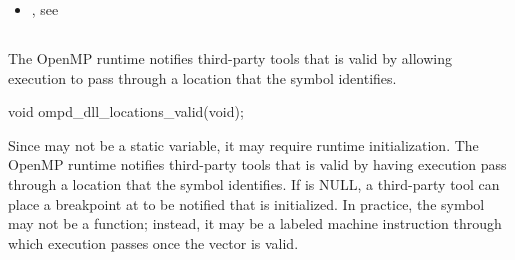 \crossreferences
\begin{itemize}
\item   {}, 
see 
\end{itemize}



\subsection{}
\label{subsubsec:ompd_dll_locations_valid}

\summary
The OpenMP runtime notifies third-party tools that 
is valid by allowing execution to pass through a location that the symbol 
 identifies.

\format
\begin{cspecific}
\begin{ompSyntax}
void ompd_dll_locations_valid(void);
\end{ompSyntax}
\end{cspecific}

\descr
Since  may not be a static variable, it may require
runtime initialization. The OpenMP runtime notifies third-party tools that 
 is valid by having execution pass through a location 
that the symbol  identifies. If 
 is NULL, a third-party tool can place a breakpoint 
at  to be notified that  
is initialized. In practice, the symbol  
may not be a function; instead, it may be a labeled machine instruction through
which execution passes once the vector is valid.
